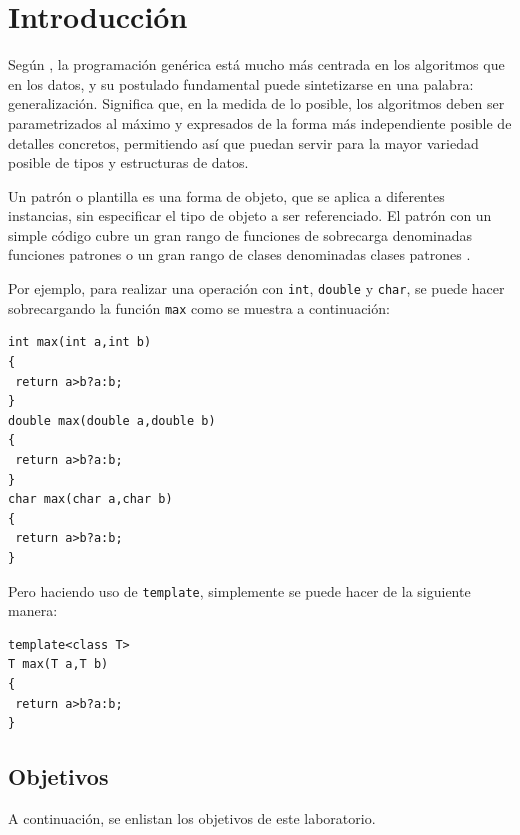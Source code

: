 \section{Introducción}

Según \cite{R1}, la programación genérica está mucho más centrada en los algoritmos que en los datos, y su postulado fundamental puede sintetizarse en una palabra: generalización. Significa que, en la medida de lo posible, los algoritmos deben ser parametrizados al máximo y expresados de la forma más independiente posible de detalles concretos, permitiendo así que puedan servir para la mayor variedad posible de tipos y estructuras de datos.

Un patrón o plantilla es una forma de objeto, que se aplica a diferentes instancias, sin especificar el tipo de objeto a ser referenciado. El patrón con un simple código cubre un gran rango de funciones de
sobrecarga denominadas funciones patrones o un gran rango de clases denominadas clases patrones \cite{R2}.

Por ejemplo, para realizar una operación con \texttt{int}, \texttt{double} y \texttt{char}, se puede hacer sobrecargando la función \texttt{max} como se muestra a continuación:

\begin{verbatim}
int max(int a,int b)
{
 return a>b?a:b;
}
double max(double a,double b)
{
 return a>b?a:b;
}
char max(char a,char b)
{
 return a>b?a:b;
}
\end{verbatim}

Pero haciendo uso de \texttt{template}, simplemente se puede hacer de la siguiente manera:

\begin{verbatim}
template<class T>
T max(T a,T b)
{
 return a>b?a:b;
}
\end{verbatim}

\subsection{Objetivos}

A continuación, se enlistan los objetivos de este laboratorio.

